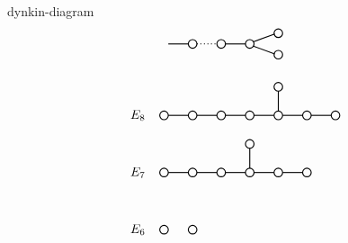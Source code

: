 \begin{example}{dynkin-diagram}
\[\begin{tikzpicture}[scale=.4]
\begin{scope}[yshift=-7.0cm]
            \draw[thick] (2cm,0) circle (.3cm);
            \draw[thick] (4cm,0) circle (.3cm);
            \draw[thick] (6cm,0) circle (.3cm);
            \draw[thick] (8cm,0.75cm) circle (.3cm);
            \draw[thick] (8cm,-0.75cm) circle (.3cm);
            \draw[thick] (0.3cm,0) -- +(1.4 cm,0);
            \draw[thick, dotted] (2.3cm,0) -- +(1.4 cm,0);
            \draw[thick] (4.3cm,0) -- +(1.4 cm,0);
            \draw[thick] (6.25cm,0.15) -- +(1.5cm,0.55);
            \draw[thick] (6.25cm,-0.15) -- +(1.5cm,-0.55);
        \end{scope}
        \begin{scope}[yshift=-12.0cm]
            \draw (-1,0) node[anchor=east] {$E_8$};
            \draw[thick] (0cm,0) circle (.3cm);
            \draw[thick] (2cm,0) circle (.3cm);
            \draw[thick] (4cm,0) circle (.3cm);
            \draw[thick] (6cm,0) circle (.3cm);
            \draw[thick] (8cm,0) circle (.3cm);
            \draw[thick] (10cm,0) circle (.3cm);
            \draw[thick] (12cm,0) circle (.3cm);
            \draw[thick] (8cm,2cm) circle (.3cm);
            \draw[thick] (0.3cm,0) -- +(1.4 cm,0);
            \draw[thick] (2.3cm,0) -- +(1.4 cm,0);
            \draw[thick] (4.3cm,0) -- +(1.4 cm,0);
            \draw[thick] (6.3cm,0) -- +(1.4 cm,0);
            \draw[thick] (8.3cm,0) -- +(1.4 cm,0);
            \draw[thick] (10.3cm,0) -- +(1.4 cm,0);
            \draw[thick] (8cm,0.3cm) -- +(0cm,1.4cm);
        \end{scope}
        \begin{scope}[yshift=-16.0cm]
            \draw (-1,0) node[anchor=east] {$E_7$};
            \draw[thick] (0cm,0) circle (.3cm);
            \draw[thick] (2cm,0) circle (.3cm);
            \draw[thick] (4cm,0) circle (.3cm);
            \draw[thick] (6cm,0) circle (.3cm);
            \draw[thick] (8cm,0) circle (.3cm);
            \draw[thick] (10cm,0) circle (.3cm);
            \draw[thick] (6cm,2cm) circle (.3cm);
            \draw[thick] (0.3cm,0) -- +(1.4 cm,0);
            \draw[thick] (2.3cm,0) -- +(1.4 cm,0);
            \draw[thick] (4.3cm,0) -- +(1.4 cm,0);
            \draw[thick] (6.3cm,0) -- +(1.4 cm,0);
            \draw[thick] (8.3cm,0) -- +(1.4 cm,0);
            \draw[thick] (6cm,0.3cm) -- +(0cm,1.4cm);
        \end{scope}
        \begin{scope}[yshift=-20.0cm]
            \draw (-1,0) node[anchor=east] {$E_6$};
            \draw[thick] (0cm,0) circle (.3cm);
            \draw[thick] (2cm,0) circle (.3cm);

\end{scope}
\end{tikzpicture}\]
\end{example}
